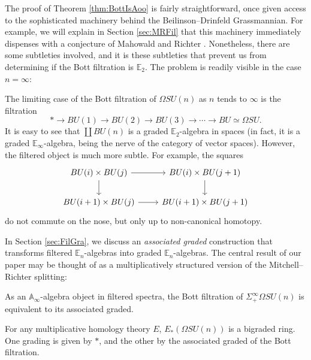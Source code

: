 The proof of Theorem \ref{thm:BottIsAoo} is fairly straightforward, once given access to the sophisticated machinery behind the Beilinson--Drinfeld Grassmannian.  For example, we will explain in Section \ref{sec:MRFil} that this machinery immediately dispenses with a conjecture of Mahowald and Richter \cite{MahowaldRichter}.  Nonetheless, there are some subtleties involved, and it is these subtleties that prevent us from determining if the Bott filtration is $\mathbb{E}_2$.  The problem is readily visible in the case $n=\infty$:

\begin{exm}\label{exm:BottFil}
The limiting case of the Bott filtration of $\Omega SU(n)$ as $n$ tends to $\infty$ is the filtration
$$* \longrightarrow BU(1) \longrightarrow BU(2) \longrightarrow BU(3) \longrightarrow \cdots \longrightarrow BU \simeq \Omega SU.$$
It is easy to see that $\coprod BU(n)$ is a graded $\mathbb{E}_2$-algebra in spaces (in fact, it is a graded $\mathbb{E}_\infty$-algebra, being the nerve of the category of vector spaces).  However, the filtered object is much more subtle.  For example, the squares
$$
\begin{tikzcd}
BU(i) \times BU(j) \arrow{d} \arrow{r} & BU(i) \times BU(j+1) \arrow{d} \\
BU(i+1) \times BU(j) \arrow{r} & BU(i+1) \times BU(j+1)
\end{tikzcd}
$$
do not commute on the nose, but only up to non-canonical homotopy.
\end{exm}

In Section \ref{sec:FilGra}, we discuss an \textit{associated graded} construction that transforms filtered $\mathbb{E}_n$-algebras into graded $\mathbb{E}_n$-algebras.  The central result of our paper may be thought of as a multiplicatively structured version of the Mitchell--Richter splitting:

\begin{thm} \label{thm:MainAoo}
As an $\mathbb{A}_\infty$-algebra object in filtered spectra, the Bott filtration of $\Sigma^{\infty}_+ \Omega SU(n)$ is equivalent to its associated graded.
\end{thm}

\begin{cor}
For any multiplicative homology theory $E$, $E_*(\Omega SU(n))$ is a bigraded ring.  One grading is given by $*$, and the other by the associated graded of the Bott filtration.
\end{cor}

